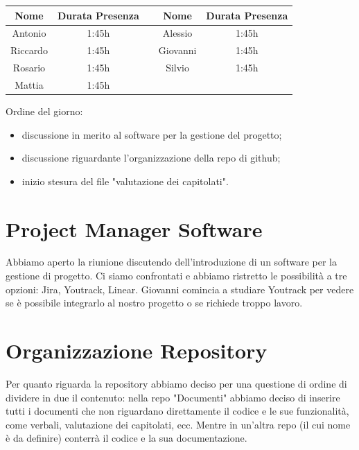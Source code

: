 \documentclass[12pt,a4paper]{article}
\begin{document}
\begin{center}
    \begin{tabular}{ |c|c|c|c|c| }
        \hline
        Nome     & Durata Presenza &  & Nome     & Durata Presenza \\
        \hline
        Antonio  & 1:45h           &  & Alessio  & 1:45h           \\
        \hline
        Riccardo & 1:45h           &  & Giovanni & 1:45h           \\
        \hline
        Rosario  & 1:45h           &  & Silvio   & 1:45h          \\
        \hline
        Mattia   & 1:45h           &  &          &                 \\
        \hline

    \end{tabular}
\end{center}

\newpage

Ordine del giorno:
\begin{itemize}
    \item discussione in merito al software per la gestione del progetto;
    \item discussione riguardante l'organizzazione della repo di github;
    \item inizio stesura del file "valutazione dei capitolati".
\end{itemize}

\section{Project Manager Software}
Abbiamo aperto la riunione discutendo dell'introduzione di 
un software per la gestione di progetto. Ci siamo confrontati 
e abbiamo ristretto le possibilità a tre opzioni: Jira, Youtrack, 
Linear. Giovanni comincia a studiare Youtrack per vedere se è 
possibile integrarlo al nostro progetto o se richiede troppo 
lavoro.

\section{Organizzazione Repository}
Per quanto riguarda la repository abbiamo deciso per una questione di ordine 
di dividere in due il contenuto: nella repo "Documenti" abbiamo deciso di inserire 
tutti i documenti che non riguardano direttamente il codice e le sue funzionalità,
come verbali, valutazione dei capitolati, ecc. Mentre in un'altra repo (il cui nome 
è da definire) conterrà il codice e la sua documentazione.
\end{document}
